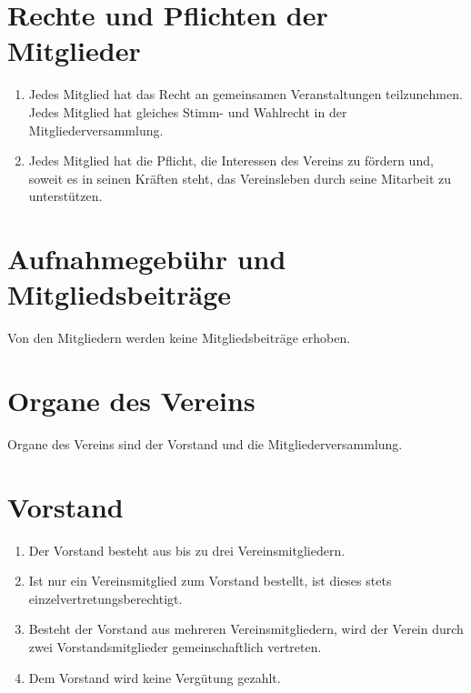 \section{Rechte und Pflichten der Mitglieder}
\begin{enumerate}[label=(\arabic*)]
    \item Jedes Mitglied hat das Recht an gemeinsamen Veranstaltungen
        teilzunehmen. Jedes Mitglied hat gleiches Stimm- und Wahlrecht in der
        Mitgliederversammlung.
    \item Jedes Mitglied hat die Pflicht, die Interessen des Vereins zu fördern
        und, soweit es in seinen Kräften steht, das Vereinsleben durch seine
        Mitarbeit zu unterstützen.
\end{enumerate}

\section{Aufnahmegebühr und Mitgliedsbeiträge}
Von den Mitgliedern werden keine Mitgliedsbeiträge erhoben.

\section{Organe des Vereins}
Organe des Vereins sind der Vorstand und die Mitgliederversammlung.

\section{Vorstand}
\begin{enumerate}[label=(\arabic*)]
    \item Der Vorstand besteht aus bis zu drei Vereinsmitgliedern.
    \item Ist nur ein Vereinsmitglied zum Vorstand bestellt, ist dieses stets
        einzelvertretungsberechtigt.
    \item Besteht der Vorstand aus mehreren Vereinsmitgliedern, wird der Verein
        durch zwei Vorstandsmitglieder gemeinschaftlich vertreten.
    \item Dem Vorstand wird keine Vergütung gezahlt.
\end{enumerate}

